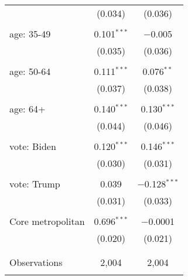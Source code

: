 \begin{tabular}{@{\extracolsep{5pt}}lcc}
  & (0.034) & (0.036) \\ 
  & & \\ 
 age: 35-49 & 0.101$^{***}$ & $-$0.005 \\ 
  & (0.035) & (0.036) \\ 
  & & \\ 
 age: 50-64 & 0.111$^{***}$ & 0.076$^{**}$ \\ 
  & (0.037) & (0.038) \\ 
  & & \\ 
 age: 64+ & 0.140$^{***}$ & 0.130$^{***}$ \\ 
  & (0.044) & (0.046) \\ 
  & & \\ 
 vote: Biden & 0.120$^{***}$ & 0.146$^{***}$ \\ 
  & (0.030) & (0.031) \\ 
  & & \\ 
 vote: Trump & 0.039 & $-$0.128$^{***}$ \\ 
  & (0.031) & (0.033) \\ 
  & & \\ 
 Core metropolitan & 0.696$^{***}$ & $-$0.0001 \\ 
  & (0.020) & (0.021) \\ 
  & & \\ 
\hline \\[-1.8ex] 

Observations & 2,004 & 2,004 \\ 
\hline 
\hline \\[-1.8ex] 
\end{tabular} 